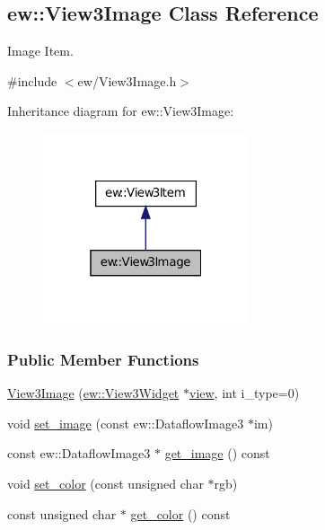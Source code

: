 \hypertarget{classew_1_1View3Image}{
\subsection{ew::View3Image Class Reference}
\label{classew_1_1View3Image}
}


Image Item.  




{\ttfamily \#include $<$ew/View3Image.h$>$}



Inheritance diagram for ew::View3Image:
\nopagebreak
\begin{figure}[H]
\begin{center}
\leavevmode
\includegraphics[width=172pt]{classew_1_1View3Image__inherit__graph}
\end{center}
\end{figure}
\subsubsection*{Public Member Functions}
\begin{DoxyCompactItemize}
\item 
\hyperlink{classew_1_1View3Image_ad4dcf5c417e3d26c03e24bd0944f3916}{View3Image} (\hyperlink{classew_1_1View3Widget}{ew::View3Widget} $\ast$\hyperlink{classew_1_1View3Item_a7d765842ec7b9e145cefa37e3dbae658}{view}, int i\_\-type=0)
\item 
void \hyperlink{classew_1_1View3Image_ac419897feabe98bc80ed6f55e5ff574f}{set\_\-image} (const ew::DataflowImage3 $\ast$im)
\item 
const ew::DataflowImage3 $\ast$ \hyperlink{classew_1_1View3Image_a47ffcb6ac24e472adadf4167ab44fc21}{get\_\-image} () const 
\item 
void \hyperlink{classew_1_1View3Image_aae9880444a3b30d5101bc3a864687cef}{set\_\-color} (const unsigned char $\ast$rgb)
\item 
const unsigned char $\ast$ \hyperlink{classew_1_1View3Image_acc36bc0737367a2197e806ed4ac09ece}{get\_\-color} () const 
\end{DoxyCompactItemize}


